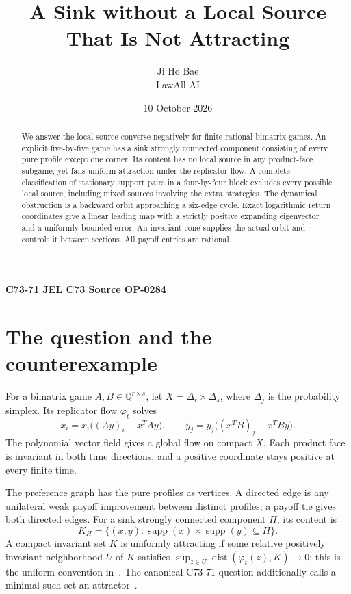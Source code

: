 \documentclass[11pt,a4paper]{article}
\title{A Sink without a Local Source\\
That Is Not Attracting}
\author{Ji Ho Bae\\\small LawAll AI}
\date{10 October 2026}
\numberwithin{equation}{section}
\theoremstyle{definition}
\newcommand{\Q}{\mathbb Q}
\DeclareMathOperator{\supp}{supp}
\DeclareMathOperator{\dist}{dist}
\begin{document}
\maketitle
\begin{center}
\small\textbf{C73-71 \quad JEL C73 \quad Source OP-0284}
\end{center}
\begin{abstract}
We answer the local-source converse negatively for finite rational
bimatrix games. An explicit five-by-five game has a sink strongly
connected component consisting of every pure profile except one corner.
Its content has no local source in any product-face subgame, yet fails
uniform attraction under the replicator flow. A complete classification
of stationary support pairs in a four-by-four block excludes every
possible local source, including mixed sources involving the extra
strategies. The dynamical obstruction is a backward orbit approaching
a six-edge cycle. Exact logarithmic return coordinates give a linear
leading map with a strictly positive expanding eigenvector and a
uniformly bounded error. An invariant cone supplies the actual orbit
and controls it between sections. All payoff entries are rational.
\end{abstract}

\section{The question and the counterexample}\label{sec:question}

For a bimatrix game \(A,B\in\Q^{r\times s}\), let
\(X=\Delta_r\times\Delta_s\), where \(\Delta_j\) is the probability
simplex. Its replicator flow \(\varphi_t\) solves
\begin{equation}\label{eq:replicator}
 \dot x_i=x_i\bigl((Ay)_i-x^TAy\bigr),\qquad
 \dot y_j=y_j\bigl((x^TB)_j-x^TBy\bigr).
\end{equation}
The polynomial vector field gives a global flow on compact \(X\).
Each product face is invariant in both time directions, and a positive
coordinate stays positive at every finite time.

The preference graph has the pure profiles as vertices. A directed
edge is any unilateral weak payoff improvement between distinct
profiles; a payoff tie gives both directed edges. For a sink strongly
connected component \(H\), its content is
\[
 K_H=\{(x,y):\supp(x)\times\supp(y)\subseteq H\}.
\]
A compact invariant set \(K\) is uniformly attracting if some relative
positively invariant neighborhood \(U\) of \(K\) satisfies
\(\sup_{z\in U}\dist(\varphi_t(z),K)\to0\); this is the uniform
convention in~\cite[Definition 3.2]{BS}. The canonical C73-71 question
additionally calls a minimal such set an attractor~\cite{catalogue}.
\end{document}
